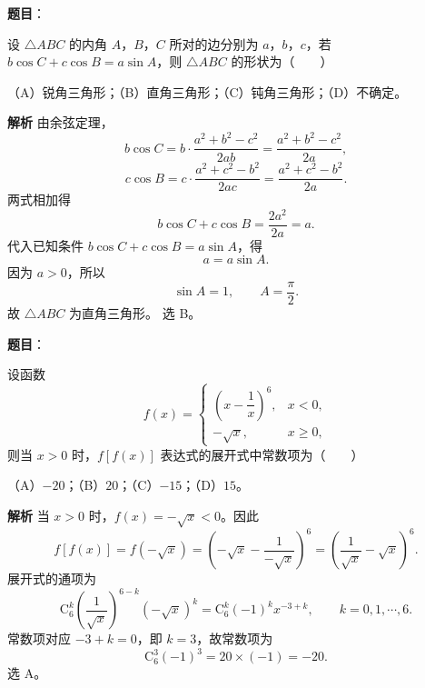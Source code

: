 \begin{answer}

\textbf{题目}：

设 $\triangle ABC$ 的内角 $A$，$B$，$C$ 所对的边分别为 $a$，$b$，$c$，若 $b\cos C+c\cos B=a\sin A$，则 $\triangle ABC$ 的形状为\mbox{（　　）}

（A）锐角三角形；（B）直角三角形；（C）钝角三角形；（D）不确定。

\textbf{解析}
由余弦定理，
\nopagebreak[4]
\[b\cos C=b\cdot\frac{a^2+b^2-c^2}{2ab}=\frac{a^2+b^2-c^2}{2a},\]
\nopagebreak[4]
\[c\cos B=c\cdot\frac{a^2+c^2-b^2}{2ac}=\frac{a^2+c^2-b^2}{2a}.\]
两式相加得
\nopagebreak[4]
\[b\cos C+c\cos B=\frac{2a^2}{2a}=a.\]
代入已知条件 $b\cos C+c\cos B=a\sin A$，得
\nopagebreak[4]
\[a=a\sin A.\]
因为 $a>0$，所以
\nopagebreak[4]
\[\sin A=1,\qquad A=\frac\pi2.\]
故 $\triangle ABC$ 为直角三角形。
选 B。


\end{answer}
\begin{answer}

\textbf{题目}：

设函数
\nopagebreak[4]
\[f(x)=\begin{cases}
\left(x-\dfrac1x\right)^6,&x<0,\\[6pt]
-\sqrt x,&x\geqslant0,
\end{cases}\]
则当 $x>0$ 时，$f[f(x)]$ 表达式的展开式中常数项为\mbox{（　　）}

（A）$-20$；（B）$20$；（C）$-15$；（D）$15$。

\textbf{解析}
当 $x>0$ 时，$f(x)=-\sqrt x<0$。因此
\nopagebreak[4]
\[f[f(x)]=f(-\sqrt x)
=\left(-\sqrt x-\frac1{-\sqrt x}\right)^6
=\left(\frac1{\sqrt x}-\sqrt x\right)^6.\]
展开式的通项为
\nopagebreak[4]
\[\mathrm C_6^k\left(\frac1{\sqrt x}\right)^{6-k}(-\sqrt x)^k
=\mathrm C_6^k(-1)^k x^{-3+k},\qquad k=0,1,\cdots,6.\]
常数项对应 $-3+k=0$，即 $k=3$，故常数项为
\nopagebreak[4]
\[\mathrm C_6^3(-1)^3=20\times(-1)=-20.\]
选 A。


\end{answer}
